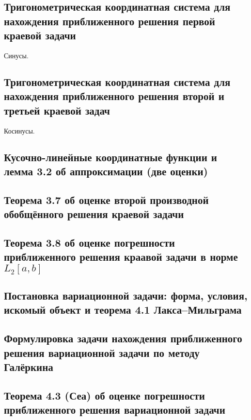 \documentclass[a4paper,14pt]{article} %
\begin{document}
\subsection{Тригонометрическая координатная система для нахождения приближенного решения первой краевой задачи}
Синусы.

\subsection{Тригонометрическая координатная система для нахождения приближенного решения второй и третьей краевой задач}
Косинусы.

\subsection{Кусочно-линейные координатные функции и лемма 3.2 об аппроксимации (две оценки)}

\subsection{Теорема 3.7 об оценке второй производной обобщённого решения краевой задачи}

\subsection{Теорема 3.8 об оценке погрешности приближенного решения краавой задачи в норме $L_2[a,b]$}

\subsection{Постановка вариационной задачи: форма, условия, искомый объект и теорема 4.1 Лакса--Мильграма}

\subsection{Формулировка задачи нахождения приближенного решения вариационной задачи по методу Галёркина}

\subsection{Теорема 4.3 (Сеа) об оценке погрешности приближенного решения вариационной задачи}
\end{document}
